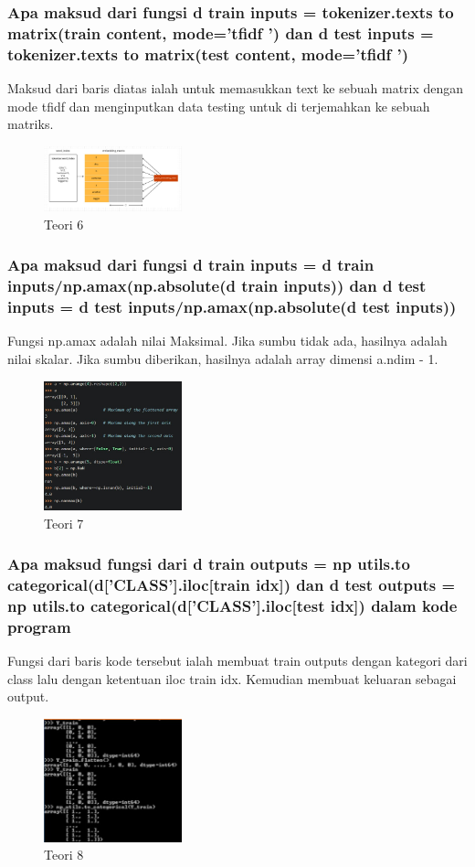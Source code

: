 \subsubsection{Apa maksud dari fungsi d train inputs = tokenizer.texts to matrix(train content, mode=’tfidf ’) dan d test inputs = tokenizer.texts to matrix(test content, mode=’tfidf ’)}
\hfill\break
Maksud dari baris diatas ialah untuk memasukkan text ke sebuah matrix dengan mode tfidf dan menginputkan data testing untuk di terjemahkan ke sebuah matriks.
\begin{figure}[H]
\centering
	\includegraphics[width=4cm]{figures/1174057/chapter7/6.jpg}
\caption{Teori 6}
\end{figure}

\subsubsection{Apa maksud dari fungsi d train inputs = d train inputs/np.amax(np.absolute(d train inputs)) dan d test inputs = d test inputs/np.amax(np.absolute(d test inputs))}
\hfill\break
Fungsi np.amax adalah nilai Maksimal. Jika sumbu tidak ada, hasilnya adalah nilai skalar. Jika sumbu diberikan, hasilnya adalah array dimensi a.ndim - 1.
\begin{figure}[H]
\centering
	\includegraphics[width=4cm]{figures/1174057/chapter7/7.jpg}
\caption{Teori 7}
\end{figure}

\subsubsection{Apa maksud fungsi dari d train outputs = np utils.to categorical(d[’CLASS’].iloc[train idx]) dan d test outputs = np utils.to categorical(d[’CLASS’].iloc[test idx]) dalam kode program}
\hfill\break
Fungsi dari baris kode tersebut ialah membuat train outputs dengan kategori dari class lalu dengan ketentuan iloc train idx. Kemudian membuat keluaran sebagai output.
\begin{figure}[H]
\centering
	\includegraphics[width=4cm]{figures/1174057/chapter7/8.jpg}
\caption{Teori 8}
\end{figure}

